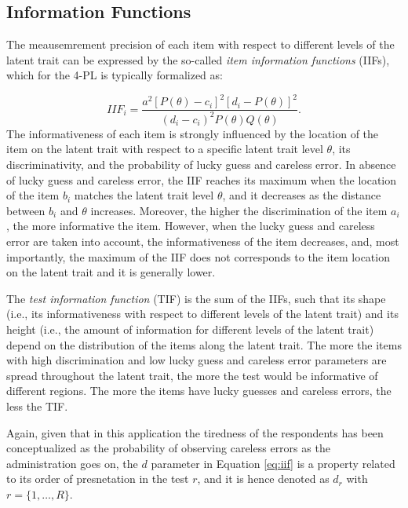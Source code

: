 \documentclass{svproc}
\begin{document}
\subsection{Information Functions}

The meausemrement precision of each item with respect to different levels of the latent trait can be expressed by the so-called \emph{item information functions} (IIFs), which for the 4-PL is typically formalized as: 

\begin{equation}\label{eq:iif}
	IIF_i = \dfrac{a^2[P(\theta)-c_i]^2[d_i - P(\theta)]^2}{(d_i-c_i)^2 P(\theta)Q(\theta)}.
\end{equation}
The informativeness of each item is strongly influenced by the location of the item on the latent trait with respect to a specific latent trait level $\theta$, its discriminativity, and the probability of lucky guess and careless error. In absence of lucky guess and careless error, the IIF reaches its maximum when the location of the item $b_i$ matches the latent trait level $\theta$, and it decreases as the distance between $b_i$ and $\theta$ increases. Moreover, the higher the discrimination of the item $a_i$, the more informative the item. However, when the lucky guess and careless error are taken into account, the informativeness of the item decreases, and, most importantly, the maximum of the IIF does not corresponds to the item location on the latent trait and it is generally lower. 

The \emph{test information function} (TIF) is the sum of the IIFs, such that its shape (i.e., its informativeness with respect to different levels of the latent trait) and its height (i.e., the amount of information for different levels of the latent trait) depend on the distribution of the items along the latent trait. The more the items with high discrimination and low lucky guess and careless error parameters are spread throughout the latent trait, the more the test would be informative of different regions. The more the items have lucky guesses and careless errors, the less the TIF. 

\color{blue}
Again, given that in this application the tiredness of the respondents has been conceptualized as the probability of observing careless errors as the administration goes on, the $d$ parameter in Equation \ref{eq:iif} is a property related to its order of presnetation in the test $r$, and it is hence denoted as $d_r$ with $r = \{1, \ldots, R\}$.
\normalcolor
\end{document}
